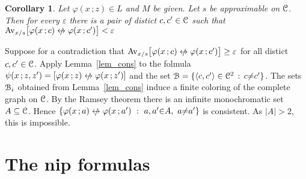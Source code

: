 \documentclass[10pt,openany]{article}
\newcommand{\sbar}[1]{\mkern 1.8mu\overline{\mkern-1.8mu#1\mkern-1mu}\mkern 1mu}
\def\niff{\mathrel{{\leftrightarrow}\llap{\raisebox{-.1ex}{{\small$/$}}\hskip.5ex}}}
\def\C{\EuScript C}
\def\U{\EuScript U}
\def\B{\EuScript B}
\def\<{\langle}
\def\>{\rangle}
\def\phi{\varphi}
\def\epsilon{\varepsilon}
\newcounter{thm}[section]
\theoremstyle{mio}
\newtheorem{corollary}[thm]{Corollary}
\newtheorem{definition}[thm]{Definition}
\theoremstyle{liscio}
\def\QED{\noindent\nolinebreak[4]\hspace{\stretch{1}}\rlap{\ \ $\Box$}\medskip}
\renewenvironment{proof}[1][Proof]%
{\begin{trivlist}\item[\hskip\labelsep {\bf #1}]}
{\QED\end{trivlist}}
\renewcommand*{\emph}[1]{%
   \kern-0.2ex 
   \smash{\tikz[baseline]
   \node[ rectangle, fill=emphcolor, rounded corners, 
          inner xsep=.3ex, inner ysep=.2ex, anchor=base,
          minimum height = 3ex
         ]{#1};
   }
   \kern-1.2ex 
}
\begin{document}
\begin{corollary}
  Let $\phi(x\,;z)\in L$ and $M$ be given.
  Let $s$ be approximable on $\C$.
  Then for every $\epsilon$ there is a pair of distict $c,c'\in\C$ such that $\Av_{x/s}\big[\phi(x\,;c)\niff\phi(x\,;c')\big]<\epsilon$
\end{corollary}

\begin{proof}
  Suppose for a contradiction that $\Av_{x/s}\big[\phi(x\,;c)\niff\phi(x\,;c')\big]\ge\epsilon$ for all distict $c,c'\in\C$. Apply Lemma~\ref{lem_cons} to the folmula $\psi(x\,;z,z') = [\phi(x\,;z)\niff\phi(x\,;z')]$ and the set $\B=\{\<c,c'\>\in\C^2\, :\, c{\neq} c'\}$.
 The sets $\B_i$ obtained from Lemma~\ref{lem_cons} induce a finite coloring of the complete graph on $\C$.
 By the Ramsey theorem there is an infinite monochromatic set $A\subseteq\C$.
 Hence $\{\phi(x\,;a)\niff\phi(x\,;a')\  :\  a,a'{\in} A,\ a{\neq} a'\}$ is consistent.
 As $|A|>2$, this is impossible.
\end{proof}




  



\section{The nip formulas}\label{nip}
\end{document}

